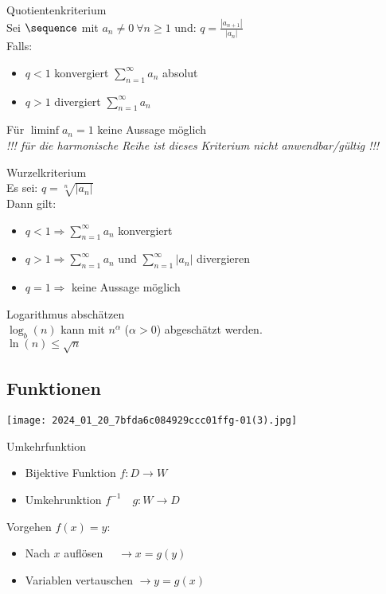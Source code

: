 \begin{concept} {Quotientenkriterium}\\
  Sei $\sequence$ mit $a_n \neq 0~\forall n \geq 1$ und: $q = \frac{|a_{n + 1}|}{|a_n|}$\\
  Falls:
  \begin{itemize}
    \item $q < 1$ konvergiert $\sum_{n=1}^\infty a_n$ absolut
    \item $q > 1$ divergiert $\sum_{n=1}^\infty a_n$
  \end{itemize}
  Für $\liminf a_n = 1$ keine Aussage möglich\\
  \emph{!!! für die harmonische Reihe ist dieses Kriterium nicht anwendbar/gültig !!!}
\end{concept}

\begin{concept} {Wurzelkriterium}\\
  Es sei: $q = \sqrt[n]{|a_n|}$\\
  Dann gilt:
  \begin{itemize}
    \item $q < 1 \Rightarrow \sum_{n=1}^\infty a_n$ konvergiert 
    \item $q > 1 \Rightarrow \sum_{n=1}^\infty a_n$ und $\sum_{n=1}^\infty |a_n|$ divergieren
    \item $q = 1 \Rightarrow$ keine Aussage möglich
  \end{itemize}
\end{concept}

\begin{KR}{Logarithmus abschätzen}\\
    $\log_b (n)$ kann mit $n^\alpha$ ($\alpha > 0$) abgeschätzt werden.\\
    $\ln(n) \leq \sqrt{n}$
\end{KR} 

\raggedcolumns
\columnbreak

\subsection{Funktionen}

\begin{center}
  \texttt{[image: 2024\_01\_20\_7bfda6c084929ccc01ffg-01(3).jpg]}
\end{center}

\begin{definition}{Umkehrfunktion}
  \begin{itemize}
    \item Bijektive Funktion $f: D \rightarrow W$
    \item Umkehrunktion $f^{-1} \quad g: W \rightarrow D$
  \end{itemize}
  Vorgehen $f(x)=y$:
  \begin{itemize}
    \item Nach $x$ auflösen $\quad \rightarrow x=g(y)$
    \item Variablen vertauschen $\rightarrow y=g(x)$
  \end{itemize}
\end{definition}


